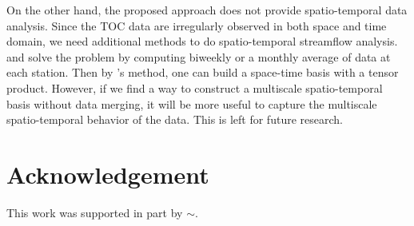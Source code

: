 \documentclass[11pt,titlepage]{article}
\begin{document}
On the other hand, the proposed approach does not provide spatio-temporal data analysis. Since the TOC data are irregularly observed in both space and time domain, we need additional methods to do spatio-temporal streamflow analysis. \cite{Lindstrom2014} and \cite{ODonnell2014} solve the problem by computing biweekly or a monthly average of data at each station. Then by \cite{ODonnell2014}'s method, one can build a space-time basis with a tensor product. However, if we find a way to construct a multiscale spatio-temporal basis without data merging, it will be more useful to capture the multiscale spatio-temporal behavior of the data. This is left for future research.







%
%
%
%


\section*{Acknowledgement}
This work was supported in part by $\sim$.%
\end{document}
